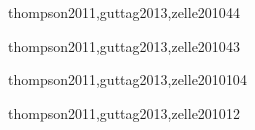 \begin{syllabus}
\begin{unit}{\ALFundamentalAlgorithmsDef}{thompson2011,guttag2013,zelle2010}{4}{4}
    \begin{topics}%
	\item \ALFundamentalAlgorithmsTopicSimple%
	\item \ALFundamentalAlgorithmsTopicSequential%
	\item \ALFundamentalAlgorithmsTopicQuadratic%
	\item \ALFundamentalAlgorithmsTopicBinary%
	\item \ALFundamentalAlgorithmsTopicDepth%
    \end{topics}%
    \ALFundamentalAlgorithmsAllObjectives
\end{unit}

\begin{unit}{\PLAbstractionMechanismsDef}{thompson2011,guttag2013,zelle2010}{4}{3}
   \begin{topics}
      \item \PLAbstractionMechanismsTopicProcedures%
      \item \PLAbstractionMechanismsTopicParameterization%
      \item \PLAbstractionMechanismsTopicType%
      \item \PLAbstractionMechanismsTopicModules%
   \end{topics}
   \begin{learningoutcomes}
      \item \PLAbstractionMechanismsObjONE%
      \item \PLAbstractionMechanismsObjTWO%
      \item \PLAbstractionMechanismsObjTHREE%
   \end{learningoutcomes}
\end{unit}

\begin{unit}{\PFAlgorithmsAndProblemSolvingDef}{thompson2011,guttag2013,zelle2010}{10}{4}
    \PFAlgorithmsAndProblemSolvingAllTopics
    \PFAlgorithmsAndProblemSolvingAllObjectives
\end{unit}

\begin{unit}{\PLVirtualMachinesDef}{thompson2011,guttag2013,zelle2010}{1}{2}
   \begin{topics}
      \item \PLVirtualMachinesTopicETheconcept
   \end{topics}
   \begin{learningoutcomes}
      \item \PLVirtualMachinesObjONE
   \end{learningoutcomes}
\end{unit}


\end{syllabus}

